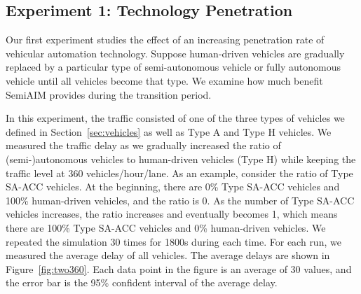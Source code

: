 
\subsection{Experiment 1: Technology Penetration}

Our first experiment studies the effect of an increasing penetration rate
of vehicular automation technology.  Suppose human-driven vehicles are
gradually replaced by a particular type of semi-autonomous vehicle or
fully autonomous vehicle until all vehicles become that type.  We examine how
much benefit SemiAIM provides during the transition period.

In this experiment, the traffic consisted of one of the three types of
vehicles we defined in Section~\ref{sec:vehicles} as well as Type A
and Type H vehicles.  We measured the traffic delay as we gradually
increased the ratio of (semi-)autonomous vehicles to human-driven
vehicles (Type H) while keeping the traffic level at 360
vehicles/hour/lane.  As an example, consider the ratio of Type SA-ACC
vehicles.  At the beginning, there are 0\% Type SA-ACC vehicles and
100\% human-driven vehicles, and the ratio is 0.  As the number of
Type SA-ACC vehicles increases, the ratio increases and eventually
becomes 1, which means there are 100\% Type SA-ACC vehicles and 0\%
human-driven vehicles.  We repeated the simulation 30 times for 1800s
during each time.  For each run, we measured the average delay of all
vehicles.  The average delays are shown in Figure~\ref{fig:two360}.
Each data point in the figure is an average of 30 values, and the
error bar is the 95\% confident interval of the average delay.
 
